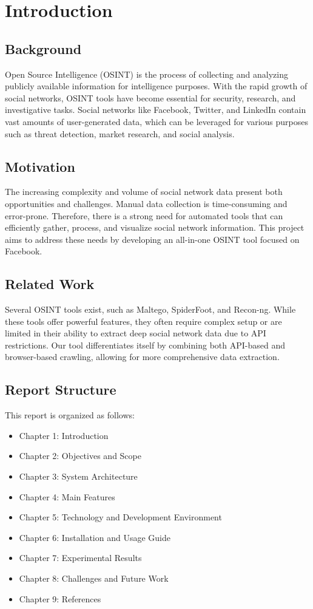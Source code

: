 \documentclass[13pt,a4paper]{report}
\begin{document}
\tableofcontents
\newpage

\chapter{Introduction}
\section{Background}
Open Source Intelligence (OSINT) is the process of collecting and analyzing publicly available information for intelligence purposes. With the rapid growth of social networks, OSINT tools have become essential for security, research, and investigative tasks. Social networks like Facebook, Twitter, and LinkedIn contain vast amounts of user-generated data, which can be leveraged for various purposes such as threat detection, market research, and social analysis.

\section{Motivation}
The increasing complexity and volume of social network data present both opportunities and challenges. Manual data collection is time-consuming and error-prone. Therefore, there is a strong need for automated tools that can efficiently gather, process, and visualize social network information. This project aims to address these needs by developing an all-in-one OSINT tool focused on Facebook.

\section{Related Work}
Several OSINT tools exist, such as Maltego, SpiderFoot, and Recon-ng. While these tools offer powerful features, they often require complex setup or are limited in their ability to extract deep social network data due to API restrictions. Our tool differentiates itself by combining both API-based and browser-based crawling, allowing for more comprehensive data extraction.

\section{Report Structure}
This report is organized as follows:
\begin{itemize}
    \item Chapter 1: Introduction
    \item Chapter 2: Objectives and Scope
    \item Chapter 3: System Architecture
    \item Chapter 4: Main Features
    \item Chapter 5: Technology and Development Environment
    \item Chapter 6: Installation and Usage Guide
    \item Chapter 7: Experimental Results
    \item Chapter 8: Challenges and Future Work
    \item Chapter 9: References
\end{itemize}
\end{document}
